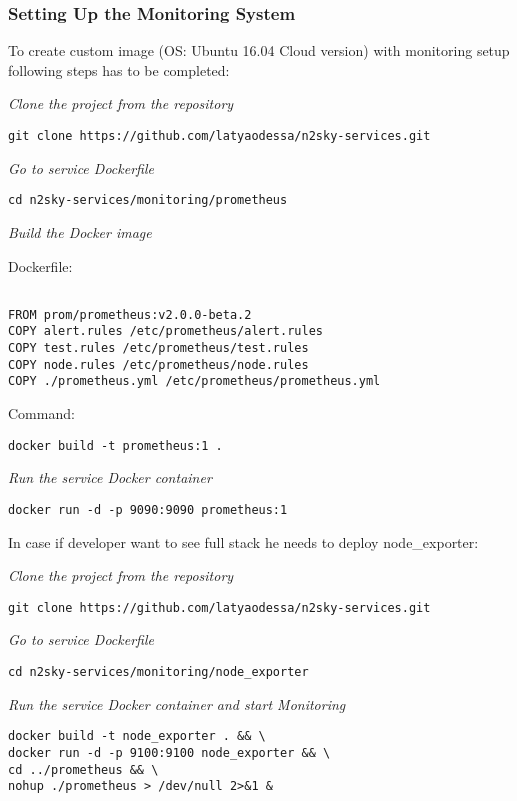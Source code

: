\subsubsection{Setting Up the Monitoring System}\label{Monitoring System setup}

To create custom image (OS: Ubuntu 16.04 Cloud version) with monitoring setup following steps has to be completed:

\emph{Clone the project from the repository}
 \begin{lstlisting}
git clone https://github.com/latyaodessa/n2sky-services.git 
\end{lstlisting}


\emph{Go to service Dockerfile}
 \begin{lstlisting}
cd n2sky-services/monitoring/prometheus
\end{lstlisting}

\emph{Build the Docker image}

Dockerfile:
 \begin{lstlisting}

FROM prom/prometheus:v2.0.0-beta.2
COPY alert.rules /etc/prometheus/alert.rules
COPY test.rules /etc/prometheus/test.rules
COPY node.rules /etc/prometheus/node.rules
COPY ./prometheus.yml /etc/prometheus/prometheus.yml

\end{lstlisting}

Command: 

 \begin{lstlisting}
docker build -t prometheus:1 .
\end{lstlisting}


\emph{Run the service Docker container}
 \begin{lstlisting}
docker run -d -p 9090:9090 prometheus:1
\end{lstlisting}


In case if developer want to see full stack he needs to deploy node\_exporter:

\emph{Clone the project from the repository}
 \begin{lstlisting}
git clone https://github.com/latyaodessa/n2sky-services.git 
\end{lstlisting}


\emph{Go to service Dockerfile}
 \begin{lstlisting}
cd n2sky-services/monitoring/node_exporter 
\end{lstlisting}

\emph{Run the service Docker container and start Monitoring}
 \begin{lstlisting}
docker build -t node_exporter . && \
docker run -d -p 9100:9100 node_exporter && \
cd ../prometheus && \
nohup ./prometheus > /dev/null 2>&1 &
\end{lstlisting}



